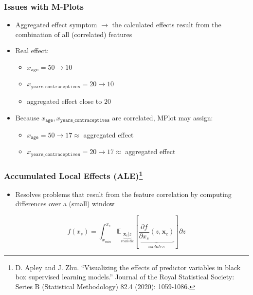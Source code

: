 \documentclass{beamer}
\newcommand{\Vx}{\mathbf{x}}
\begin{document}
\begin{frame}
  \frametitle{Issues with M-Plots}
  \begin{itemize}
  \item Aggregated effect symptom \(\rightarrow\) the calculated
    effects result from the combination of all (correlated) features
  \item Real effect:
    \begin{itemize}
    \item \(x_{\mathtt{age}} = 50 \rightarrow 10\)
    \item  \(x_{\mathtt{years\_contraceptives}} = 20 \rightarrow 10\)
    \item  aggregated effect close to \(20\)
    \end{itemize}
  \item Because \(x_{\mathtt{age}}, x_{\mathtt{years\_contraceptives}}\) are correlated, MPlot may assign:
    \begin{itemize}
    \item \(x_{\mathtt{age}} = 50 \rightarrow 17 \approx \) aggregated effect
    \item  \(x_{\mathtt{years\_contraceptives}} = 20 \rightarrow 17 \approx \) aggregated effect
    \end{itemize}
  \end{itemize}
\end{frame}

\begin{frame}
  \frametitle{Accumulated Local Effects (ALE)\footnote{D. Apley and
    J. Zhu. ``Visualizing the effects of predictor variables in black box
    supervised learning models.'' Journal of the Royal Statistical Society:
    Series B (Statistical Methodology) 82.4 (2020): 1059-1086.}}

  \begin{itemize}
  \item Resolves problems that result from the feature correlation by computing
    differences over a (small) window
  \end{itemize}

  \[f(x_s) = \int_{x_{min}}^{x_s} \mathbb{E}_{\underbrace{\Vx_c|z}_{realistic}} [ \underbrace{\frac{\partial f}{\partial x_s}(z, \Vx_c)}_{isolates} ] \partial z\]

\end{frame}
\end{document}
